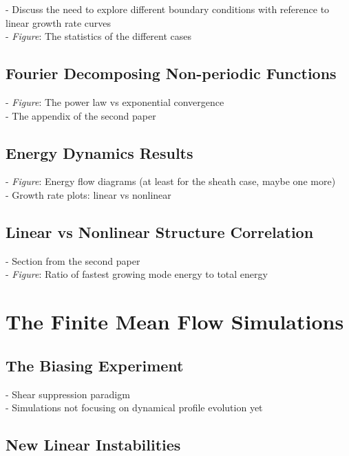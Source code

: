 \documentclass[12pt]{article}
\begin{document}
- Discuss the need to explore different boundary conditions with reference to linear growth rate curves \\
- \emph{Figure}: The statistics of the different cases \\

\subsection{Fourier Decomposing Non-periodic Functions}

- \emph{Figure}: The power law vs exponential convergence \\
- The appendix of the second paper \\

\subsection{Energy Dynamics Results}

- \emph{Figure}: Energy flow diagrams (at least for the sheath case, maybe one more) \\
- Growth rate plots: linear vs nonlinear \\

\subsection{Linear vs Nonlinear Structure Correlation}

- Section from the second paper \\
- \emph{Figure}: Ratio of fastest growing mode energy to total energy \\

\section{The Finite Mean Flow Simulations}

\subsection{The Biasing Experiment}

- Shear suppression paradigm \\
- Simulations not focusing on dynamical profile evolution yet \\

\subsection{New Linear Instabilities}
\end{document}
